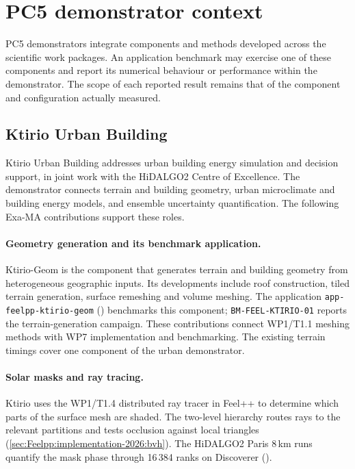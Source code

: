 \section{PC5 demonstrator context}
\label{sec:pc5:demonstrator-context}

PC5 demonstrators integrate components and methods developed across the
scientific work packages. An application benchmark may exercise one of
these components and report its numerical behaviour or performance within the demonstrator. The scope of each reported result
remains that of the component and configuration actually measured.

\subsection{Ktirio Urban Building}
\label{sec:pc5:ktirio-urban-building}

Ktirio Urban Building addresses urban building energy simulation and
decision support, in joint work with the HiDALGO2 Centre of Excellence.
The demonstrator connects terrain and building geometry, urban microclimate
and building energy models, and ensemble uncertainty quantification.
The following Exa-MA contributions support these roles.

\paragraph{Geometry generation and its benchmark application.}
Ktirio-Geom is the component that generates terrain and building geometry
from heterogeneous geographic inputs. Its developments include roof
construction, tiled terrain generation, surface remeshing and volume
meshing. The application \texttt{app-feelpp-ktirio-geom}
() benchmarks this component;
\texttt{BM-FEEL-KTIRIO-01} reports the terrain-generation campaign.
These contributions connect WP1/T1.1 meshing methods with WP7 implementation
and benchmarking. The existing terrain timings cover one component of the
urban demonstrator.

\paragraph{Solar masks and ray tracing.}
Ktirio uses the WP1/T1.4 distributed ray tracer in Feel++ to determine
which parts of the surface mesh are shaded. The two-level hierarchy
routes rays to the relevant partitions and tests occlusion against
local triangles (\cref{sec:Feelpp:implementation-2026:bvh}). The
HiDALGO2 Paris 8\,km runs quantify the mask phase through 16\,384 ranks
on Discoverer ().

